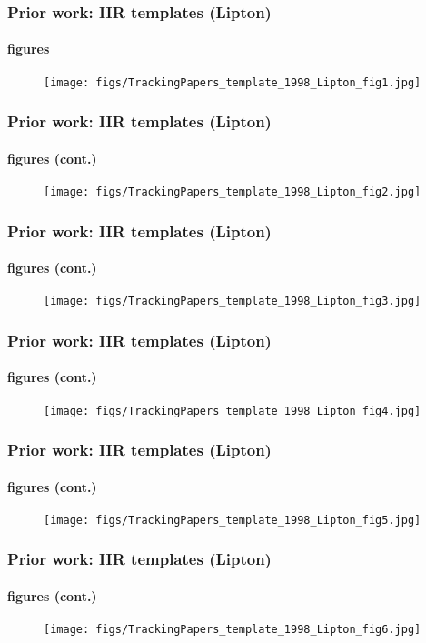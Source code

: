 \begin{frame}
\frametitle{Prior work: IIR templates (Lipton)}
\framesubtitle{figures}
\mypagenum
{}
	\begin{figure}
		\texttt{[image: figs/TrackingPapers\_template\_1998\_Lipton\_fig1.jpg]}
	\end{figure}
\end{frame}


\begin{frame}
\frametitle{Prior work: IIR templates (Lipton)}
\framesubtitle{figures (cont.)}
\mypagenum
{}
	\begin{figure}
		\texttt{[image: figs/TrackingPapers\_template\_1998\_Lipton\_fig2.jpg]}
	\end{figure}
\end{frame}


\begin{frame}
\frametitle{Prior work: IIR templates (Lipton)}
\framesubtitle{figures (cont.)}
\mypagenum
{}
	\begin{figure}
		\texttt{[image: figs/TrackingPapers\_template\_1998\_Lipton\_fig3.jpg]}
	\end{figure}
\end{frame}



\begin{frame}
\frametitle{Prior work: IIR templates (Lipton)}
\framesubtitle{figures (cont.)}
\mypagenum
{}
	\begin{figure}
		\texttt{[image: figs/TrackingPapers\_template\_1998\_Lipton\_fig4.jpg]}
	\end{figure}
\end{frame}



\begin{frame}
\frametitle{Prior work: IIR templates (Lipton)}
\framesubtitle{figures (cont.)}
\mypagenum
{}
	\begin{figure}
		\texttt{[image: figs/TrackingPapers\_template\_1998\_Lipton\_fig5.jpg]}
	\end{figure}
\end{frame}



\begin{frame}
\frametitle{Prior work: IIR templates (Lipton)}
\framesubtitle{figures (cont.)}
\mypagenum
{}
	\begin{figure}
		\texttt{[image: figs/TrackingPapers\_template\_1998\_Lipton\_fig6.jpg]}
	\end{figure}
\end{frame}



